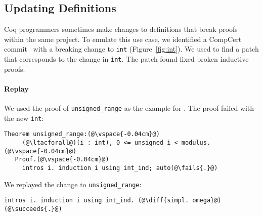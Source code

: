 \lstset{language=coq, aboveskip=3pt,belowskip=3pt}

\subsection{Updating Definitions}
\label{sec:compcert}

Coq programmers sometimes make changes to definitions that break proofs
within the same project. To emulate this use case, 
we identified a CompCert commit~\cite{compcertcommit}
with a breaking change to \lstinline{int} (Figure~\ref{fig:int}). %
We used \sysname to find a patch that corresponds to the change in \lstinline{int}.
The patch \sysname found fixed broken inductive proofs.




\paragraph{Replay} We used the proof of \lstinline{unsigned_range} as the example for \sysname.
The proof failed with the new \lstinline{int}:

\lstset{language=coq, aboveskip=3pt,belowskip=3pt}
\begin{lstlisting}[language=coq]
   Theorem unsigned_range:(@\vspace{-0.04cm}@)
     (@\ltacforall@)(i : int), 0 <= unsigned i < modulus.(@\vspace{-0.04cm}@)
   Proof.(@\vspace{-0.04cm}@)
     intros i. induction i using int_ind; auto(@\fails{.}@)
\end{lstlisting}

We replayed the change to \lstinline{unsigned_range}:

\begin{lstlisting}[language=coq]
     intros i. induction i using int_ind. (@\diff{simpl. omega}@)(@\succeeds{.}@)
\end{lstlisting}

